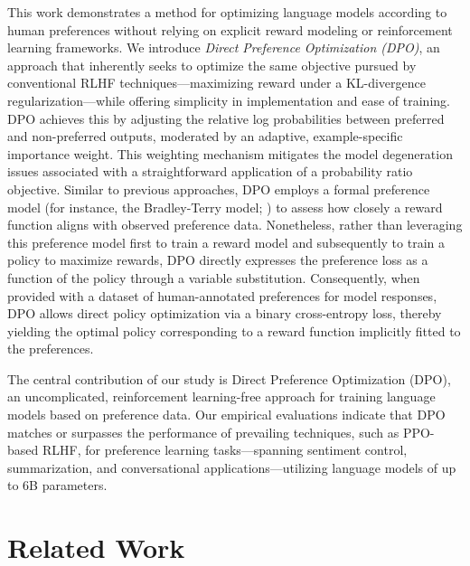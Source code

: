 This work demonstrates a method for optimizing language models according to human preferences without relying on explicit reward modeling or reinforcement learning frameworks. We introduce \textit{{Direct Preference Optimization} (DPO)}, an approach that inherently seeks to optimize the same objective pursued by conventional RLHF techniques—maximizing reward under a KL-divergence regularization—while offering simplicity in implementation and ease of training. DPO achieves this by adjusting the relative log probabilities between preferred and non-preferred outputs, moderated by an adaptive, example-specific importance weight. This weighting mechanism mitigates the model degeneration issues associated with a straightforward application of a probability ratio objective. Similar to previous approaches, DPO employs a formal preference model (for instance, the Bradley-Terry model; \cite{bradley1952rankanalysis}) to assess how closely a reward function aligns with observed preference data. Nonetheless, rather than leveraging this preference model first to train a reward model and subsequently to train a policy to maximize rewards, DPO directly expresses the preference loss as a function of the policy through a variable substitution. Consequently, when provided with a dataset of human-annotated preferences for model responses, DPO allows direct policy optimization via a binary cross-entropy loss, thereby yielding the optimal policy corresponding to a reward function implicitly fitted to the preferences.

The central contribution of our study is Direct Preference Optimization (DPO), an uncomplicated, reinforcement learning-free approach for training language models based on preference data. Our empirical evaluations indicate that DPO matches or surpasses the performance of prevailing techniques, such as PPO-based RLHF, for preference learning tasks—spanning sentiment control, summarization, and conversational applications—utilizing language models of up to 6B parameters.

\section{Related Work}

